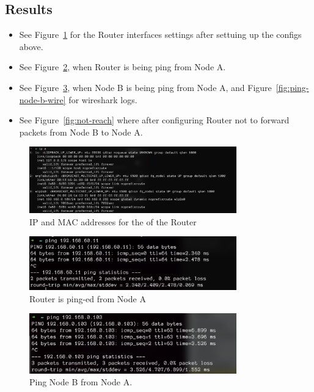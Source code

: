 \documentclass{article}
\begin{document}
\subsection{Results} %
\label{sub:Results}
\begin{itemize}
	\item See Figure~\ref{fig:interfaces} for the Router interfaces settings after settuing up
	      the configs above.
	\item See Figure~\ref{fig:ping-router}, when Router is being ping from Node A.
	\item See Figure~\ref{fig:ping-node-b}, when Node B is being ping from Node A, and Figure~\ref{fig:ping-node-b-wire} for
	      wireshark logs.
	\item See Figure~\ref{fig:not-reach} where after configuring Router not to forward packets
	      from Node B to Node A.
\end{itemize}

\begin{figure}[!hb]
	\centering
	\includegraphics[width=0.8\textwidth]{figures/interfaces}
	\caption{IP and MAC addresses for the of the Router}
	\label{fig:interfaces}
\end{figure}

\begin{figure}[!hb]
	\centering
	\includegraphics[width=0.8\textwidth]{figures/ping-router}
	\caption{Router is ping-ed from Node A}
	\label{fig:ping-router}
\end{figure}

\begin{figure}[!hb]
	\centering
	\includegraphics[width=0.8\textwidth]{figures/ping-node-b}
	\caption{Ping Node B from Node A.}
	\label{fig:ping-node-b}
\end{figure}
\end{document}
